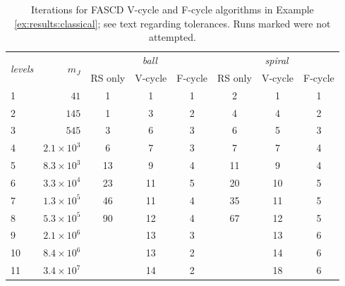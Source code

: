\documentclass[review,hidelinks,onefignum,onetabnum]{siamart220329}
\newcommand{\XX}{\ding{55}}
\begin{document}
\begin{table}[ht]
\centering
\begin{tabular}{lr@{\hskip 7mm}cccccc}
\toprule
\multirow{2}{*}{\emph{levels}} & \multirow{2}{*}{$m_J$} & \multicolumn{3}{c}{\,\emph{ball}} & \multicolumn{3}{c}{\,\emph{spiral}} \\ \cmidrule(lr){3-5} \cmidrule(lr){6-8}
   &                  & RS only & V-cycle & F-cycle & RS only & V-cycle & F-cycle \\
\midrule
 1 &             $41$ &   1 &  1 &  1 &   2 &  1 &  1 \\
 2 &            $145$ &   1 &  3 &  2 &   4 &  4 &  2 \\
 3 &            $545$ &   3 &  6 &  3 &   6 &  5 &  3 \\
 4 & $2.1\times 10^3$ &   6 &  7 &  3 &   7 &  7 &  4 \\
 5 & $8.3\times 10^3$ &  13 &  9 &  4 &  11 &  9 &  4 \\
 6 & $3.3\times 10^4$ &  23 & 11 &  5 &  20 & 10 &  5 \\
 7 & $1.3\times 10^5$ &  46 & 11 &  4 &  35 & 11 &  5 \\
 8 & $5.3\times 10^5$ &  90 & 12 &  4 &  67 & 12 &  5 \\
 9 & $2.1\times 10^6$ & \XX & 13 &  3 & \XX & 13 &  6 \\
10 & $8.4\times 10^6$ & \XX & 13 &  2 & \XX & 14 &  6 \\
11 & $3.4\times 10^7$ & \XX & 14 &  2 & \XX & 18 &  6 \\
\bottomrule
\end{tabular}
\bigskip
\caption{Iterations for FASCD V-cycle and F-cycle algorithms in Example \ref{ex:results:classical}; see text regarding tolerances.  Runs marked \XX\xspace were not attempted.}
\label{tab:results:classical}
\end{table}
\end{document}
